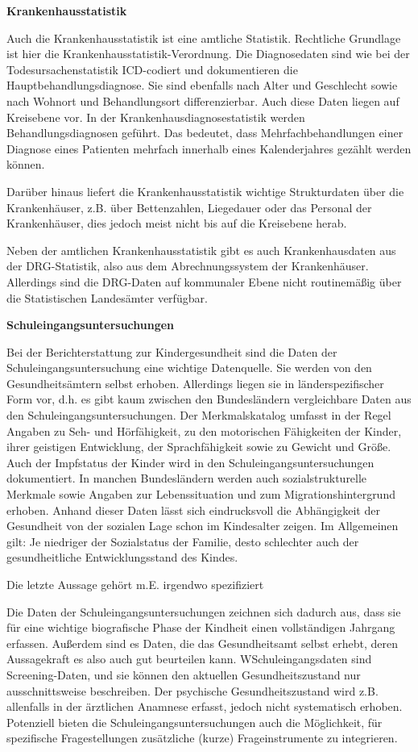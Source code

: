 \documentclass{article}
\begin{document}
\textbf{Krankenhausstatistik}


Auch die Krankenhausstatistik ist eine amtliche Statistik. Rechtliche Grundlage ist hier die Krankenhausstatistik-Verordnung. Die Diagnosedaten sind wie bei der Todesursachenstatistik ICD-codiert und dokumentieren die Hauptbehandlungsdiagnose. Sie sind ebenfalls nach Alter und Geschlecht sowie nach Wohnort und Behandlungsort differenzierbar. Auch diese Daten liegen auf Kreisebene vor. In der Krankenhausdiagnosestatistik werden Behandlungsdiagnosen geführt. Das bedeutet, dass Mehrfachbehandlungen einer Diagnose eines Patienten mehrfach innerhalb eines Kalenderjahres gezählt werden können. 


Darüber hinaus liefert die Krankenhausstatistik wichtige Strukturdaten über die Krankenhäuser, z.B. über Bettenzahlen, Liegedauer oder das Personal der Krankenhäuser, dies jedoch meist nicht bis auf die Kreisebene herab.


Neben der amtlichen Krankenhausstatistik gibt es auch Krankenhausdaten aus der DRG-Statistik, also aus dem Abrechnungssystem der Krankenhäuser. Allerdings sind die DRG-Daten auf kommunaler Ebene nicht routinemäßig über die Statistischen Landesämter verfügbar.


\textbf{Schuleingangsuntersuchungen}


Bei der Berichterstattung zur Kindergesundheit sind die Daten der Schuleingangsuntersuchung eine wichtige Datenquelle. Sie werden von den Gesundheitsämtern selbst erhoben. Allerdings liegen sie in länderspezifischer Form vor, d.h. es gibt kaum zwischen den Bundesländern vergleichbare Daten aus den Schuleingangsuntersuchungen. Der Merkmalskatalog umfasst in der Regel Angaben zu Seh- und Hörfähigkeit, zu den motorischen Fähigkeiten der Kinder, ihrer geistigen Entwicklung, der Sprachfähigkeit sowie zu Gewicht und Größe. Auch der Impfstatus der Kinder wird in den Schuleingangsuntersuchungen dokumentiert. In manchen Bundesländern werden auch sozialstrukturelle Merkmale sowie Angaben zur Lebenssituation  und zum Migrationshintergrund erhoben. Anhand dieser Daten lässt sich eindrucksvoll die Abhängigkeit der Gesundheit von der sozialen Lage schon im Kindesalter zeigen. Im Allgemeinen gilt: Je niedriger der Sozialstatus der Familie, desto schlechter auch der gesundheitliche Entwicklungsstand des Kindes.


Die letzte Aussage gehört m.E. irgendwo spezifiziert


Die Daten der Schuleingangsuntersuchungen zeichnen sich dadurch aus, dass sie für eine wichtige biografische Phase der Kindheit einen vollständigen Jahrgang erfassen. Außerdem sind es Daten, die das Gesundheitsamt selbst erhebt, deren Aussagekraft es also auch gut beurteilen kann. WSchuleingangsdaten sind Screening-Daten, und sie können den aktuellen Gesundheitszustand nur ausschnittsweise beschreiben. Der psychische Gesundheitszustand wird z.B. allenfalls in der ärztlichen Anamnese erfasst, jedoch nicht systematisch erhoben.  Potenziell bieten die Schuleingangsuntersuchungen auch die Möglichkeit, für spezifische Fragestellungen zusätzliche (kurze) Frageinstrumente zu integrieren.
\end{document}
